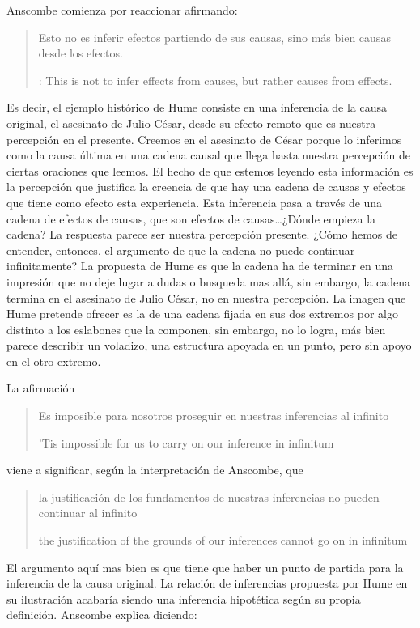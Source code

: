 Anscombe comienza por reaccionar afirmando:
\blockquote[{\cite[86]{anscombe1981hjc}}: This is not to infer effects from
causes, but rather causes from effects.]{Esto no es inferir efectos partiendo de
  sus causas, sino más bien causas desde los efectos.} Es decir, el ejemplo
histórico de Hume consiste en una inferencia de la causa original, el asesinato
de Julio César, desde su efecto remoto que es nuestra percepción en el presente.
Creemos en el asesinato de César porque lo inferimos como la causa última en una
cadena causal que llega hasta nuestra percepción de ciertas oraciones que
leemos. El hecho de que estemos leyendo esta información es la percepción que
justifica la creencia de que hay una cadena de causas y efectos que tiene como
efecto esta experiencia. Esta inferencia pasa a través de una cadena de efectos
de causas, que son efectos de causas\ldots ¿Dónde empieza la cadena? La
respuesta parece ser nuestra percepción presente. ¿Cómo hemos de entender,
entonces, el argumento de que la cadena no puede continuar infinitamente? La
propuesta de Hume es que la cadena ha de terminar en una impresión que no deje
lugar a dudas o busqueda mas allá, sin embargo, la cadena termina en el
asesinato de Julio César, no en nuestra percepción. La imagen que Hume pretende
ofrecer es la de una cadena fijada en sus dos extremos por algo distinto a los
eslabones que la componen, sin embargo, no lo logra, más bien parece describir
un voladizo, una estructura apoyada en un punto, pero sin apoyo en el otro
extremo.

La afirmación \blockquote['Tis impossible for us to carry on our inference in
infinitum]{Es imposible para nosotros proseguir en nuestras inferencias al
  infinito} viene a significar, según la interpretación de Anscombe, que
\blockquote[the justification of the grounds of our inferences cannot go on in
infinitum]{la justificación de los fundamentos de nuestras inferencias no pueden
  continuar al infinito}. El argumento aquí mas bien es que tiene que haber un
punto de partida para la inferencia de la causa original. La relación de
inferencias propuesta por Hume en su ilustración acabaría siendo una inferencia
hipotética según su propia definición. Anscombe explica diciendo:

